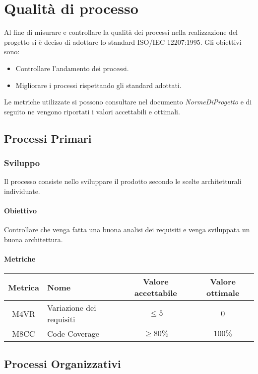 \section{Qualità di processo}
Al fine di misurare e controllare la qualità dei processi nella realizzazione del progetto si è deciso di 
adottare lo standard ISO/IEC 12207:1995.
Gli obiettivi sono:
\begin{itemize}
    \item Controllare l'andamento dei processi.
    \item Migliorare i processi rispettando gli standard adottati.
\end{itemize}
Le metriche utilizzate si possono consultare nel documento \emph{NormeDiProgetto} e di
seguito ne vengono riportati i valori accettabili e ottimali.

\subsection{Processi Primari}
\subsubsection{Sviluppo}
Il processo consiste nello sviluppare il prodotto secondo le scelte architetturali individuate.
\paragraph{Obiettivo} \hfill \break
Controllare che venga fatta una buona analisi dei requisiti e venga sviluppata un buona architettura.

\paragraph{Metriche}
\begin{center}
    \renewcommand{\arraystretch}{1.8}
    \begin{tabular}{ |c|m{12em}|c|c|}
        \hline
        \textbf{Metrica} & \textbf{Nome} & \textbf{Valore accettabile} & \textbf{Valore ottimale} \\
        \hline
        M4VR & Variazione dei requisiti & $ \leq 5 $ & $ 0 $ \\
        \hline
        M8CC & Code Coverage & $ \geq 80\% $ & $ 100\% $ \\
        \hline
    \end{tabular}
\end{center}

\subsection{Processi Organizzativi}

